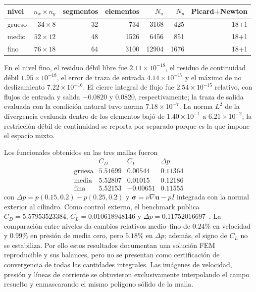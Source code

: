 \begin{center}
\small
\begin{tabular}{lrrrrrr}
\hline
nivel & $n_x\times n_y$ & segmentos & elementos & $N_u$ & $N_p$ & Picard+Newton\\
\hline
grueso & $34\times8$ & 32 & 734 & 3168 & 425 & 18+1\\
medio  & $52\times12$ & 48 & 1526 & 6456 & 851 & 18+1\\
fino   & $76\times18$ & 64 & 3100 & 12904 & 1676 & 18+1\\
\hline
\end{tabular}
\end{center}

En el nivel fino, el residuo débil libre fue
\(2.11\times10^{-18}\), el residuo de continuidad débil
\(1.95\times10^{-18}\), el error de traza de entrada
\(4.14\times10^{-17}\) y el máximo de no deslizamiento
\(7.22\times10^{-16}\). El cierre integral de flujo fue
\(2.54\times10^{-15}\) relativo, con flujos de entrada y salida
\(-0.0820\) y \(0.0820\), respectivamente; la traza de salida evaluada con
la condición natural tuvo norma \(7.18\times10^{-7}\). La norma \(L^2\) de
la divergencia evaluada dentro de los elementos bajó de
\(1.40\times10^{-1}\) a \(6.21\times10^{-2}\); la restricción débil de
continuidad se reporta por separado porque es la que impone el espacio mixto.

Los funcionales obtenidos en las tres mallas fueron
\[
\begin{array}{c|rrr}
 & C_D & C_L & \Delta p\\\hline
\text{gruesa} & 5.51699 & 0.00544 & 0.11364\\
\text{media}  & 5.52807 & 0.01015 & 0.12186\\
\text{fina}   & 5.52153 & -0.00651 & 0.11555
\end{array}
\]
con \(\Delta p=p(0.15,0.2)-p(0.25,0.2)\) y
\(\boldsymbol\sigma=\nu\nabla\mathbf u-pI\) integrada con la normal
exterior al cilindro. Como control externo, el benchmark publica
\(C_D=5.57953523384\), \(C_L=0.010618948146\) y
\(\Delta p=0.11752016697\)~\cite{dfgRe20}. La comparación entre niveles da
 cambios relativos medio--fino de \(0.24\%\) en velocidad y \(0.99\%\) en
 presión de media cero, pero \(5.18\%\) en \(\Delta p\); además, el signo de
 \(C_L\) no se estabiliza. Por ello estos resultados documentan una solución
 FEM reproducible y sus balances, pero no se presentan como certificación de
 convergencia de todas las cantidades integrales. Las imágenes de velocidad,
 presión y líneas de corriente se obtuvieron exclusivamente interpolando el
 campo resuelto y enmascarando el mismo polígono sólido de la malla.

